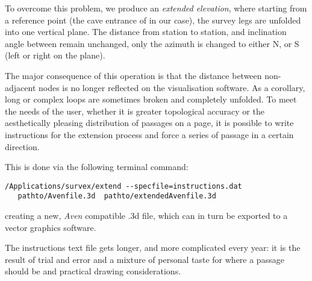 To overcome this problem, we produce an \emph{extended elevation}, where starting from a reference point (the cave entrance of  in our case), the survey legs are unfolded into one vertical plane. The distance from station to station, and inclination angle between remain unchanged, only the azimuth is changed to either N, or S (left or right on the plane). 

The major consequence of this operation is that the distance between non-adjacent nodes is no longer reflected on the visualisation software. As a corollary, long or complex loops are sometimes broken and completely unfolded. To meet the needs of the user, whether it is greater topological accuracy or the aesthetically pleasing distribution of passages on a page, it is possible to write instructions for the extension process and force a series of passage in a certain direction.

 

This is done via the following terminal command:
\begin{verbatim}
/Applications/survex/extend --specfile=instructions.dat 
   pathto/Avenfile.3d  pathto/extendedAvenfile.3d
\end{verbatim}

\begin{marginfigure}
 \checkoddpage \ifoddpage \forcerectofloat \else \forceversofloat \fi
 \centering
\end{marginfigure}

creating a new, \emph{Aven} compatible .3d file, which can in turn be exported to a vector graphics software.

The instructions text file gets longer, and more complicated every year: it is the result of trial and error and a mixture of personal taste for where a passage should be and practical drawing considerations. 

